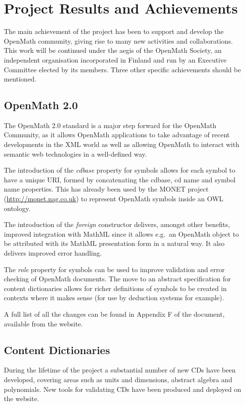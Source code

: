 \chapter{Project Results and Achievements}

The main achievement of the project has been to support and develop the
OpenMath community, giving rise to many new activities and
collaborations.  This work will be continued under the aegis of the
OpenMath Society, an independent organisation incorporated in Finland
and run by an Executive Committee elected by its members.  Three other
specific achievements should be mentioned.

\section{OpenMath 2.0}

The OpenMath 2.0 standard is a major step forward for the OpenMath
Community, as it allows OpenMath applications to take advantage of
recent developments in the XML world as well as allowing OpenMath to
interact with semantic web technologies in a well-defined way.

The introduction of the \emph{cdbase} property for symbols allows for
each symbol to have a unique URI, formed by concatenating the cdbase,
cd name and symbol name properties.  This has already been used by the
MONET project (\url{http://monet.nag.co.uk}) to represent OpenMath
symbols inside an OWL ontology.

The introduction of the \emph{foreign} constructor delivers, amongst
other benefits, improved integration with MathML since it allows e.g.~an
OpenMath object to be attributed with its MathML presentation form in a
natural way.  It also delivers improved error handling.

The \emph{role} property for symbols can be used to improve validation
and error checking of OpenMath documents.  The move to an abstract
specification for content dictionaries allows for richer definitions of
symbols to be created in contexts where it makes sense (for use by
deduction systems for example).  

A full list of all the changes can be found in Appendix F of the
document, available from the website.

\section{Content Dictionaries}

During the lifetime of the project a substantial number of new CDs have
been developed, covering areas such as units and dimensions, abstract
algebra and polynomials.   New tools for validating CDs have been
produced and deployed on the website.

